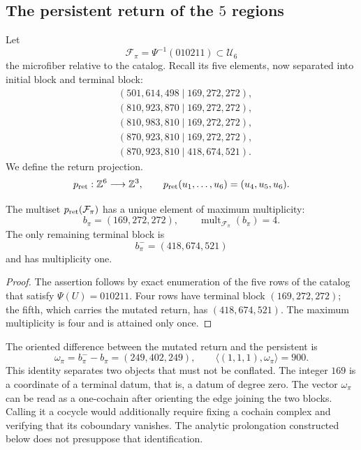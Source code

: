 \subsection{The persistent return of the \(5\) regions}

Let
\[
\mathcal F_\pi=\Psi^{-1}(010211)\subset\mathcal U_6
\]
the microfiber relative to the catalog. Recall its five elements, now
separated into initial block and terminal block:
\[
\begin{aligned}
 &(501,614,498\mid169,272,272),\\
 &(810,923,870\mid169,272,272),\\
 &(810,983,810\mid169,272,272),\\
 &(870,923,810\mid169,272,272),\\
 &(870,923,810\mid418,674,521).
\end{aligned}
\]
We define the return projection.
\[
p_{\rm ret}:\mathbb Z^6\longrightarrow\mathbb Z^3,
\qquad
p_{\rm ret}(u_1,\ldots,u_6)=(u_4,u_5,u_6).
\]

\begin{proposition}
\label{p12-83-c13-s3:prop:bloque-terminal-persistente}
The multiset \(p_{\rm ret}(\mathcal F_\pi)\) has a unique element of
maximum multiplicity:
\[
b_\pi=(169,272,272),
\qquad
\operatorname{mult}_{\mathcal F_\pi}(b_\pi)=4.
\]
The only remaining terminal block is
\[
b_\pi^-=(418,674,521)
\]
and has multiplicity one.
\end{proposition}

\begin{proof}
The assertion follows by exact enumeration of the five rows of the
catalog that satisfy \(\Psi(U)=010211\). Four rows have terminal
block \((169,272,272)\); the fifth, which carries the mutated return, has
\((418,674,521)\). The maximum multiplicity is four and is attained only
once.
\end{proof}

The oriented difference between the mutated return and the persistent is
\[
 \omega_\pi=b_\pi^- - b_\pi=(249,402,249),
 \qquad
 \langle(1,1,1),\omega_\pi\rangle=900.
\]
This identity separates two objects that must not be conflated. The integer
\(169\) is a coordinate of a terminal datum, that is, a datum of degree
zero. The vector \(\omega_\pi\) can be read as a one-cochain
after orienting the edge joining the two blocks. Calling it a cocycle would additionally
require fixing a cochain complex and verifying that its coboundary vanishes.
The analytic prolongation constructed below does not presuppose that
identification.

